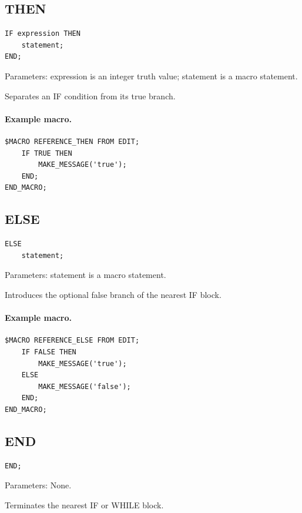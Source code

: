 \documentclass[a4paper,10pt,twoside,openany]{book}
\begin{document}
\label{prim:keyword-then}
\subsection*{THEN}
\begin{verbatim}
IF expression THEN
    statement;
END;
\end{verbatim}
Parameters: expression is an integer truth value; statement is a macro statement.

Separates an IF condition from its true branch.

\paragraph{Example macro.}
\begin{verbatim}
$MACRO REFERENCE_THEN FROM EDIT;
    IF TRUE THEN
        MAKE_MESSAGE('true');
    END;
END_MACRO;
\end{verbatim}

\label{prim:keyword-else}
\subsection*{ELSE}
\begin{verbatim}
ELSE
    statement;
\end{verbatim}
Parameters: statement is a macro statement.

Introduces the optional false branch of the nearest IF block.

\paragraph{Example macro.}
\begin{verbatim}
$MACRO REFERENCE_ELSE FROM EDIT;
    IF FALSE THEN
        MAKE_MESSAGE('true');
    ELSE
        MAKE_MESSAGE('false');
    END;
END_MACRO;
\end{verbatim}

\label{prim:keyword-end}
\subsection*{END}
\begin{verbatim}
END;
\end{verbatim}
Parameters: None.

Terminates the nearest IF or WHILE block.
\end{document}
